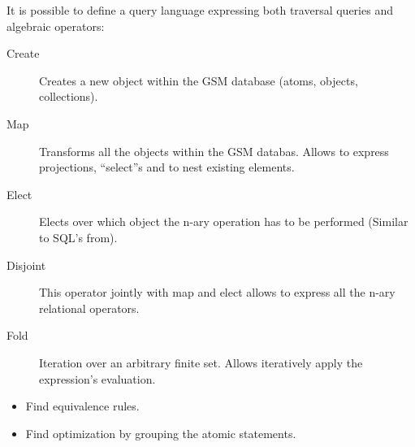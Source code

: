 \begin{multilucido}
	\begin{sottolucido}
		\centering
	\end{sottolucido}

	\begin{sottolucido}
		It is possible to define a query language expressing both traversal queries and algebraic operators:
		\begin{description}
			\item[Create] Creates a new object within the GSM database (atoms, objects, collections).
			
			\item[Map] Transforms all the objects within the GSM databas. Allows to express projections, ``select''s and to nest existing elements.
			
			\item[Elect] Elects over which object the n-ary operation has to be performed (Similar to SQL's from).
			
			\item[Disjoint] This operator jointly with map and elect allows to express all the n-ary relational operators. 
			
			\item[Fold] Iteration over an arbitrary \alert{finite} set. Allows iteratively apply the expression's evaluation.  
			
		\end{description}
	\end{sottolucido}
\end{multilucido}

\begin{lucido}
\begin{itemize}
	\item Find equivalence rules.
	\item Find optimization by grouping the atomic statements.
\end{itemize}
\end{lucido}
